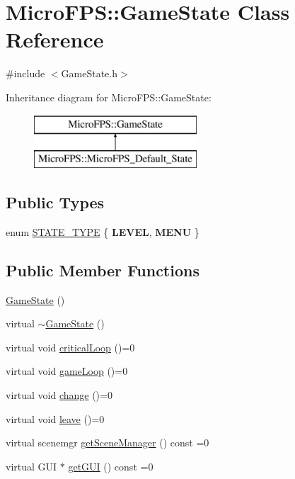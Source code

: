 \hypertarget{class_micro_f_p_s_1_1_game_state}{
\section{MicroFPS::GameState Class Reference}
\label{df/dc6/class_micro_f_p_s_1_1_game_state}
}


{\ttfamily \#include $<$GameState.h$>$}

Inheritance diagram for MicroFPS::GameState:\begin{figure}[H]
\begin{center}
\leavevmode
\includegraphics[height=2.000000cm]{df/dc6/class_micro_f_p_s_1_1_game_state}
\end{center}
\end{figure}
\subsection*{Public Types}
\begin{DoxyCompactItemize}
\item 
enum \hyperlink{class_micro_f_p_s_1_1_game_state_a2473115955f3009dae963b45f6a45ef3}{STATE\_\-TYPE} \{ {\bfseries LEVEL}, 
{\bfseries MENU}
 \}
\end{DoxyCompactItemize}
\subsection*{Public Member Functions}
\begin{DoxyCompactItemize}
\item 
\hyperlink{class_micro_f_p_s_1_1_game_state_a9ff190c74054ce2a3f5f5dd82601fc42}{GameState} ()
\item 
virtual \hyperlink{class_micro_f_p_s_1_1_game_state_ac7ed58f354a2a1e5d1942f5d361a9dab}{$\sim$GameState} ()
\item 
virtual void \hyperlink{class_micro_f_p_s_1_1_game_state_ac14111702f8eb2bae5f24102f585be92}{criticalLoop} ()=0
\item 
virtual void \hyperlink{class_micro_f_p_s_1_1_game_state_abb50cf29131b2099d78021de1322d778}{gameLoop} ()=0
\item 
virtual void \hyperlink{class_micro_f_p_s_1_1_game_state_a45db2d9ce96ac103465f798145f86927}{change} ()=0
\item 
virtual void \hyperlink{class_micro_f_p_s_1_1_game_state_a3e8da39e3c244a903a4e26252f9856a6}{leave} ()=0
\item 
virtual scenemgr \hyperlink{class_micro_f_p_s_1_1_game_state_a0b4c12fd50d7250e08ae82594231b0ef}{getSceneManager} () const =0
\item 
virtual GUI $\ast$ \hyperlink{class_micro_f_p_s_1_1_game_state_aa56075c68fd9dddc15cf067c5626e507}{getGUI} () const =0
\end{DoxyCompactItemize}


